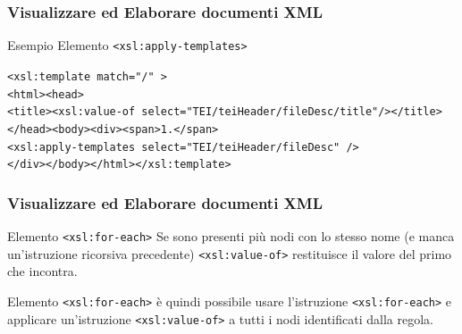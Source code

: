 \begin{frame}
    \frametitle{Visualizzare ed Elaborare documenti XML}
    \addtocounter{nframe}{1}
    

     \begin{block}{Esempio Elemento \texttt{<xsl:apply-templates>}}
        
        \texttt{<xsl:template match="/" >}
        \\\texttt{<html><head>}
        \\\texttt{<title><xsl:value-of select="TEI/teiHeader/fileDesc/title"/></title>}
        \\\texttt{</head><body><div><span>1.</span>}
        \\\texttt{<xsl:apply-templates select="TEI/teiHeader/fileDesc" />}
        \\\texttt{</div></body></html></xsl:template>}

     \end{block}
    
\end{frame}



\begin{frame}
    \frametitle{Visualizzare ed Elaborare documenti XML}
    \addtocounter{nframe}{1}
    

     \begin{block}{Elemento \texttt{<xsl:for-each>}}
        Se sono presenti più nodi con lo stesso nome (e manca un’istruzione ricorsiva precedente) \texttt{<xsl:value-of>} restituisce il valore del primo che incontra.
     \end{block}

     \begin{block}{Elemento \texttt{<xsl:for-each>}}
        è quindi possibile usare l’istruzione \texttt{<xsl:for-each>} e applicare un’istruzione \texttt{<xsl:value-of>} a tutti i nodi identificati dalla regola.
     \end{block}

\end{frame}

